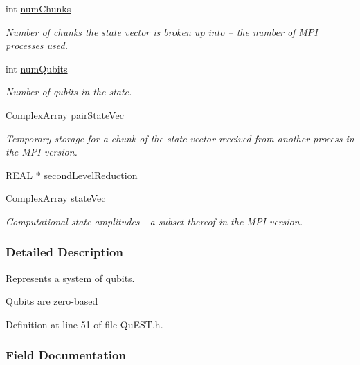 \begin{DoxyCompactItemize}
int \mbox{\hyperlink{structMultiQubit_acd43f2f57991709c9e94f73662c972b2}{num\+Chunks}}
\begin{DoxyCompactList}\small\item\em Number of chunks the state vector is broken up into -- the number of M\+PI processes used. \end{DoxyCompactList}\item 
int \mbox{\hyperlink{structMultiQubit_ab5b9795bdc6fb5855e1974dcbbaeb36f}{num\+Qubits}}
\begin{DoxyCompactList}\small\item\em Number of qubits in the state. \end{DoxyCompactList}\item 
\mbox{\hyperlink{structComplexArray}{Complex\+Array}} \mbox{\hyperlink{structMultiQubit_a76f7db4eab52d2b30f58f973ada809c5}{pair\+State\+Vec}}
\begin{DoxyCompactList}\small\item\em Temporary storage for a chunk of the state vector received from another process in the M\+PI version. \end{DoxyCompactList}\item 
\mbox{\hyperlink{QuEST__precision_8h_a4b654506f18b8bfd61ad2a29a7e38c25}{R\+E\+AL}} $\ast$ \mbox{\hyperlink{structMultiQubit_a3e859cefa146ec7b30464ab3d897930b}{second\+Level\+Reduction}}
\item 
\mbox{\hyperlink{structComplexArray}{Complex\+Array}} \mbox{\hyperlink{structMultiQubit_a45483190d6b01ef6b2f98f2bec9ab94f}{state\+Vec}}
\begin{DoxyCompactList}\small\item\em Computational state amplitudes -\/ a subset thereof in the M\+PI version. \end{DoxyCompactList}\end{DoxyCompactItemize}


\subsubsection{Detailed Description}
Represents a system of qubits. 

Qubits are zero-\/based 

Definition at line 51 of file Qu\+E\+S\+T.\+h.



\subsubsection{Field Documentation}
\mbox{\label{structMultiQubit_ab10c88249fa3825d6227ceec01d37e37}} 
